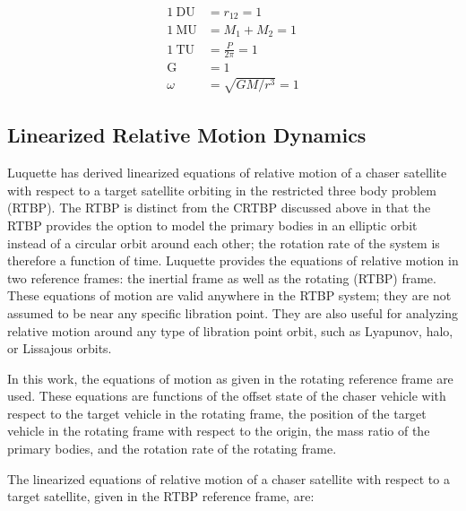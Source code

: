 \documentclass[letterpaper, preprint, paper,11pt]{AAS}	%
\begin{document}
\begin{equation} \label{eq:nondimen}
\begin{aligned}
\mathrm{1 \: DU} &= r_{12} = 1 \\           %
\mathrm{1 \: MU} &= M_1 + M_2 = 1 \\
\mathrm{1 \: TU} &= \frac{P}{2\pi} = 1 \\
\mathrm{G} &= 1 \\
\omega &= \sqrt{GM/r^3} = 1
\end{aligned}
\end{equation}

\subsection{Linearized Relative Motion Dynamics}
Luquette has derived linearized equations of relative motion of a chaser satellite with respect to a target satellite orbiting in the restricted three body problem (RTBP).\cite{luquette2004} The RTBP is distinct from the CRTBP discussed above in that the RTBP provides the option to model the primary bodies in an elliptic orbit instead of a circular orbit around each other; the rotation rate of the system is therefore a function of time. Luquette provides the equations of relative motion in two reference frames: the inertial frame as well as the rotating (RTBP) frame.  These equations of motion are valid anywhere in the RTBP system; they are not assumed to be near any specific libration point.  They are also useful for analyzing relative motion around any type of libration point orbit, such as Lyapunov, halo, or Lissajous orbits. 

In this work, the equations of motion as given in the rotating reference frame are used. These equations are functions of the offset state of the chaser vehicle with respect to the target vehicle in the rotating frame, the position of the target vehicle in the rotating frame with respect to the origin, the mass ratio of the primary bodies, and the rotation rate of the rotating frame.


The linearized equations of relative motion of a chaser satellite with respect to a target satellite, given in the RTBP reference frame, are:
\end{document}
